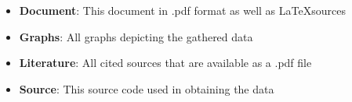 \documentclass[11pt,a4paper,twoside,openright]{scrbook}
\begin{document}
\listoffigures
\newpage

\listoftables
\newpage


\begin{itemize}
\item \textbf{Document}: This document in .pdf format as well as \LaTeX sources
\item \textbf{Graphs}: All graphs depicting the gathered data
\item \textbf{Literature}: All cited sources that are available as a .pdf file
\item \textbf{Source}: This source code used in obtaining the data
\end{itemize}
\end{document}
